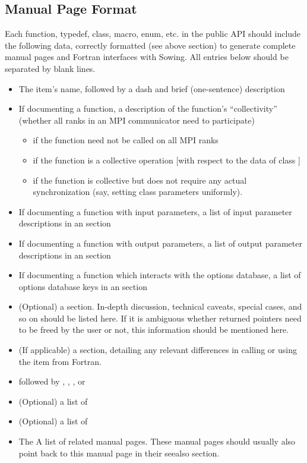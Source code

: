 \subsection{Manual Page Format}
Each function, typedef, class, macro, enum, etc. in the public API should include the following data, correctly formatted
(see above section) to generate complete manual pages and Fortran interfaces with Sowing. 
All entries below should be separated by blank lines.
\begin{itemize}
  \item The item's name, followed by a dash and brief (one-sentence) description
  \item If documenting a function, a description of the function's ``collectivity'' (whether all ranks in an MPI communicator need to participate)
    \begin{itemize}
    \item {} if the function need not be called on all MPI ranks
    \item {} if the function is a collective operation [with respect to the data of class ]
    \item {} if the function is collective but does not require any actual synchronization (say, setting class parameters uniformly).
    \end{itemize}
  \item If documenting a function with input parameters, a list of input parameter descriptions in an  section
  \item If documenting a function with output parameters, a list of output parameter descriptions in an  section
  \item If documenting a function which interacts with the options database, a list of options database keys in an  section
  \item (Optional) a  section. In-depth discussion, technical caveats, special cases, and so on should be listed here. 
    If it is ambiguous whether returned pointers need to be freed by the user or not, this information should be mentioned here.
  \item (If applicable) a  section, detailing any relevant differences in calling or using the item from Fortran.
  \item {} followed by , , , or 
  \item (Optional) a list of 
  \item (Optional) a list of 
  \item The  A list of related manual pages. These manual pages should usually also point back to this manual page in their seealso section.
\end{itemize}

